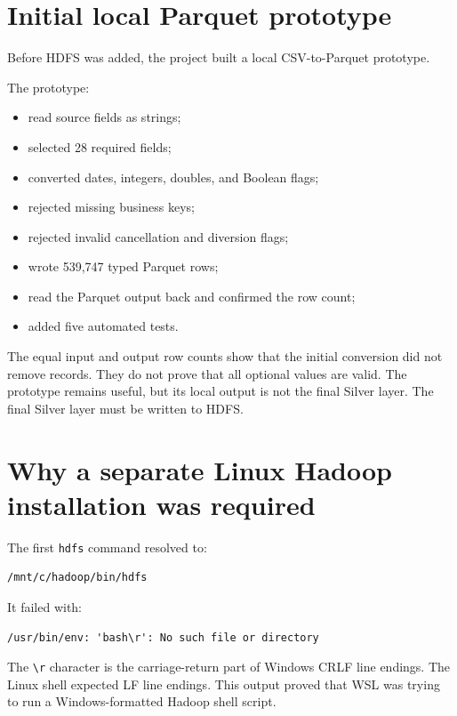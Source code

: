 \documentclass[11pt,a4paper]{article}
\begin{document}
\section{Initial local Parquet prototype}

Before HDFS was added, the project built a local CSV-to-Parquet prototype.

The prototype:

\begin{itemize}[leftmargin=*]
  \item read source fields as strings;
  \item selected 28 required fields;
  \item converted dates, integers, doubles, and Boolean flags;
  \item rejected missing business keys;
  \item rejected invalid cancellation and diversion flags;
  \item wrote 539,747 typed Parquet rows;
  \item read the Parquet output back and confirmed the row count;
  \item added five automated tests.
\end{itemize}

The equal input and output row counts show that the initial conversion did not remove records. They do not prove that all optional values are valid. The prototype remains useful, but its local output is not the final Silver layer. The final Silver layer must be written to HDFS.

\section{Why a separate Linux Hadoop installation was required}

The first \texttt{hdfs} command resolved to:

\begin{lstlisting}
/mnt/c/hadoop/bin/hdfs
\end{lstlisting}

It failed with:

\begin{lstlisting}
/usr/bin/env: 'bash\r': No such file or directory
\end{lstlisting}

The \texttt{\textbackslash r} character is the carriage-return part of Windows CRLF line endings. The Linux shell expected LF line endings. This output proved that WSL was trying to run a Windows-formatted Hadoop shell script.
\end{document}
